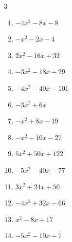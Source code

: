 \begin{multicols}{3}
\begin{enumerate}
  \item $-4x^{2}-8x-8$


  \item $-x^{2}-2x-4$


  \item $2x^{2}-16x+32$


  \item $-3x^{2}-18x-29$


  \item $-4x^{2}-40x-101$


  \item $-3x^{2}+6x$


\columnbreak %

  \item $-x^{2}+8x-19$


  \item $-x^{2}-10x-27$


  \item $5x^{2}+50x+122$


  \item $-5x^{2}-40x-77$


  \item $3x^{2}+24x+50$


  \item $-4x^{2}+32x-66$


  \item $x^{2}-8x+17$


  \item $-5x^{2}-10x-7$


\end{enumerate}
\end{multicols}
